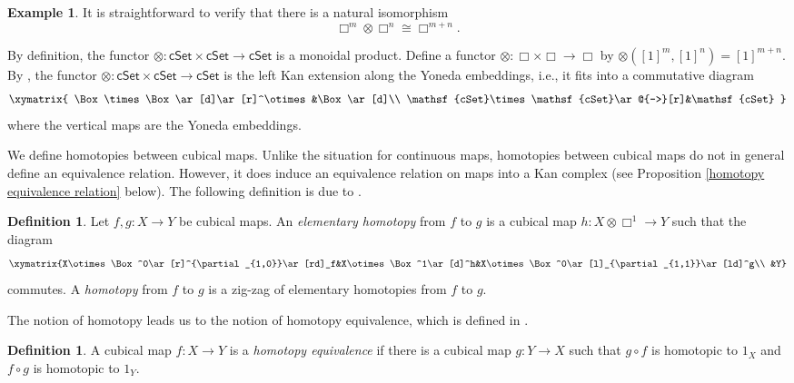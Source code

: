 \documentclass[oneside, 12pt]{amsart}
\numberwithin{equation}{section}
\theoremstyle{plain}
\theoremstyle{definition}
\newtheorem{definition}[theorem]{Definition}
\newtheorem{example}[theorem]{Example}
\theoremstyle{remark}
\newcommand{\cSet}{\mathsf{cSet}}
\begin{document}
	
	
	\begin{example}
		It is straightforward to verify that there is a natural isomorphism
		\[
		\Box^m\otimes\Box^n\cong\Box^{m+n}.
		\]
	\end{example}
	
	
	
	By definition, the functor $\otimes\colon\cSet\times\cSet\to\cSet$ is a monoidal product. Define a functor $\otimes\colon\Box\times\Box\to\Box$ by $\otimes([1]^m,[1]^n)=[1]^{m+n}$. By \cite[Proposition 1.24]{DKLS}, the functor $\otimes\colon\cSet\times\cSet\to\cSet$ is the left Kan extension along the Yoneda embeddings, i.e., it fits into a commutative diagram
	\[
	\xymatrix{
		\Box\times\Box\ar[d]\ar[r]^\otimes&\Box\ar[d]\\
		\cSet\times\cSet\ar@{-->}[r]&\cSet
	}
	\]
	where the vertical maps are the Yoneda embeddings.
	
	
	
	We define homotopies between cubical maps. Unlike the situation for continuous maps, homotopies between cubical maps do not in general define an equivalence relation. However, it does induce an equivalence relation on maps into a Kan complex (see Proposition \ref{homotopy equivalence relation} below). The following definition is due to \cite[Definitions 2.8 and 2.11]{CK1}.
	
	
	
	\begin{definition}
		Let $f,g\colon X\to Y$ be cubical maps. An \emph{elementary homotopy} from $f$ to $g$ is a cubical map $h\colon X\otimes\Box^1\to Y$ such that the diagram
		\[
		\xymatrix{X\otimes\Box^0\ar[r]^{\partial_{1,0}}\ar[rd]_f&X\otimes\Box^1\ar[d]^h&X\otimes\Box^0\ar[l]_{\partial_{1,1}}\ar[ld]^g\\
			&Y}
		\]
		commutes. A \emph{homotopy} from $f$ to $g$ is a zig-zag of elementary homotopies from $f$ to $g$.
	\end{definition}
	The notion of homotopy leads us to the notion of homotopy equivalence, which is defined in \cite[Definition 2.13]{CK1}.
	\begin{definition}
		A cubical map $f\colon X\to Y$ is a \emph{homotopy equivalence} if there is a cubical map $g\colon Y\to X$ such that $g\circ f$ is homotopic to $1_X$ and $f\circ g$ is homotopic to $1_Y$.
	\end{definition}
	
\end{document}
